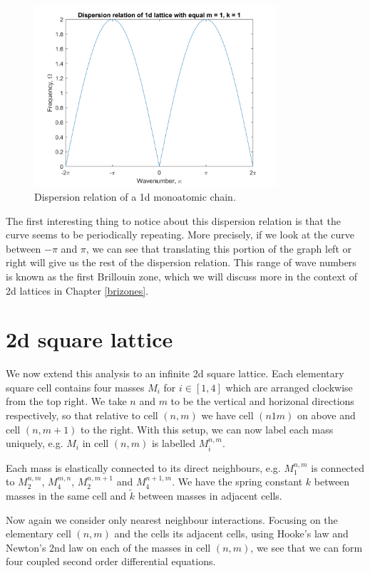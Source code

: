 \begin{figure}[!h]
\centering
\includegraphics[width=0.8\textwidth]{imgs/1ddispersion.png}
\caption{\label{fig:dc1}Dispersion relation of a 1d monoatomic
         chain.}
\end{figure}

The first interesting thing to notice about this dispersion relation is that
the curve seems to be periodically repeating. More precisely, if we look at the
curve between $-\pi$ and $\pi$, we can see that translating this portion of the
graph left or right will give us the rest of the dispersion relation. This range
of wave numbers is known as the first Brillouin zone, which we will discuss
more in the context of 2d lattices in Chapter \ref{brizones}.

\section{2d square lattice}
We now extend this analysis to an infinite 2d square lattice. Each elementary
square cell contains four masses $M_i$ for $i\in\left[1, 4\right]$ which are
arranged clockwise from the top right. We take $n$ and $m$ to be the vertical
and horizonal directions respectively, so that relative to cell $(n, m)$ we
have cell $(n 1 m)$ on above and cell $(n,m+1)$ to the right. With this setup,
we can now label each mass uniquely, e.g. $M_i$ in cell $(n, m)$ is labelled
$M_i^{n,m}$.

Each mass is elastically connected to its direct neighbours, e.g. $M_1^{n,m}$
is connected to $M_2^{n,m}$, $M_4^{m,n}$, $M_2^{n,m+1}$ and $M_4^{n+1,m}$. We
have the spring constant $k$ between masses in the same cell and $\tilde{k}$
between masses in adjacent cells.

Now again we consider only nearest neighbour interactions. Focusing on the
elementary cell $(n,m)$ and the cells its adjacent cells, using Hooke's law and
Newton's 2nd law on each of the masses in cell $(n,m)$, we see that we can form
four coupled second order differential equations.

